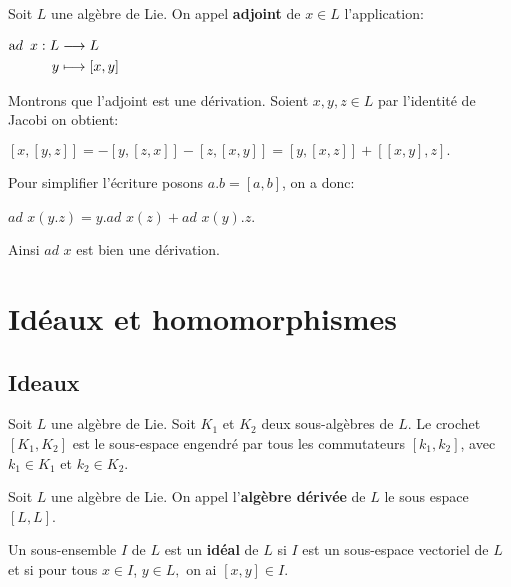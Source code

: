 \documentclass[a4paper,openany,12pt]{report}
\theoremstyle{break}
{\theorembodyfont{\upshape}
\newtheorem*{rmq}{Remarque :}
\newtheorem*{prv}{Preuve :}
\newtheorem*{ex}{Exemples :}
\newtheorem*{exe}{Exemple : }
\newtheorem*{nota}{Notation :}
\newtheorem*{dem}{D\'emonstration :}}
\begin{document}
\begin{exe}
\quad Soit $L$ une algèbre de Lie. On appel \textbf{adjoint} de $x \in L$ l'application:
\begin{center}
$\begin{aligned} \text  ad \enskip x : L & \longrightarrow L \\ y & \longmapsto[x, y] \end{aligned}$
\end{center}

Montrons que l'adjoint est une dérivation. Soient $x,y,z \in L$ par l'identité de Jacobi on obtient:
\begin{center}
$[x,[y,z]]=-[y,[z,x]]-[z,[x,y]]=[y,[x,z]]+[[x,y],z].$
\end{center}
Pour simplifier l'écriture posons $a.b=[a,b]$, on a donc: 
\begin{center}
$ad$ $x(y.z)=y.ad$ $x(z)+ad$ $x(y).z$.
\end{center} 
Ainsi $ad$ $x$ est bien une dérivation.
\end{exe}

\section{Idéaux et homomorphismes}

\subsection{Ideaux}

\begin{df}
\quad Soit $L$ une algèbre de Lie. Soit $K_1$ et $K_2$ deux sous-algèbres de $L$. Le crochet $[K_1,K_2]$ est le sous-espace engendré par tous les commutateurs $[k_1,k_2]$, avec $k_1 \in K_1$ et $k_2 \in K_2$.
\end{df}

\begin{df}
\quad Soit $L$ une algèbre de Lie. On appel l'\textbf{algèbre dérivée} de $L$ le sous espace $[L,L]$.
\end{df}

\begin{df}
\quad Un sous-ensemble $I$ de $L$ est un \textbf{idéal} de $L$ si $I$ est un sous-espace vectoriel de $L$ et si pour tous $x \in I$, $y \in L,$ on ai $[x, y] \in I$.
\end{df}
\end{document}
